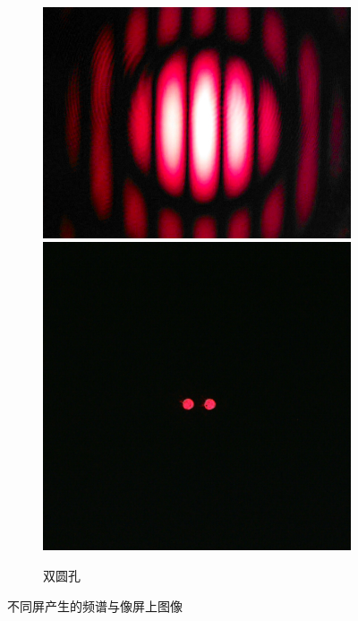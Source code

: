 \documentclass[a4paper]{article}
\begin{document}
\begin{figure}[H]
\begin{subfigure}[t]{0.3\textwidth}
        \includegraphics[width=\textwidth]{fre-done/1-6.JPG}
        \includegraphics[width=\textwidth]{img-done/1-6.JPG}
        \caption{双圆孔}
        \label{1-6}
    \end{subfigure}
    \captionsetup{justification=centering,subrefformat=parens}
    \caption{不同屏产生的频谱与像屏上图像}

\end{figure}
\end{document}
